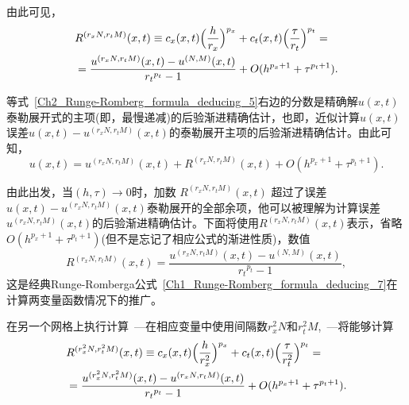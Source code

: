 \documentclass[twoside]{book}
\begin{document}
\begin{CJK*}{GBK}{song}
	由此可见，
	\begin{align}
	\label{Ch2_Runge-Romberg_formula_deducing_5}
	&R^{(r_x N, r_t M)}(x,t) \equiv c_x(x,t) \Big(\frac{h}{r_x}\Big)^{p_x} +  c_t(x,t) \Big(\frac{\tau}{r_t}\Big)^{p_t} = \notag\\
	&= \frac{u^{(r_x N,r_t M)}(x,t) - u^{(N,M)}(x,t)}{{r_t}^{p_t} - 1} + O(h^{p_x + 1} + \tau^{p_t + 1}).
	\end{align}
	
	等式~\eqref{Ch2_Runge-Romberg_formula_deducing_5}右边的分数是精确解$u(x,t)$泰勒展开式的主项(即，最慢递减)的后验渐进精确估计，也即，近似计算$u(x,t)$误差$u(x,t) - u^{(r_x N, r_t M)}(x,t)$的泰勒展开主项的后验渐进精确估计。由此可知，
	\begin{equation*}
	\label{Ch2_Runge-Romberg_formula_deducing_6}
	u(x,t) = u^{(r_x N, r_t M)}(x,t) + R^{(r_x N, r_t M)}(x,t) + O(h^{p_x + 1} + \tau^{p_t + 1}).
	\end{equation*}
	
	由此出发，当$(h,\tau) \to 0$时，加数 $R^{(r_x N, r_t M)}(x,t)$ 超过了误差$u(x,t) - u^{(r_x N, r_t M)}(x,t)$泰勒展开的全部余项，他可以被理解为计算误差$u^{(r_x N, r_t M)}(x,t)$的后验渐进精确估计。下面将使用$R^{(r_x N, r_t M)}(x,t)$表示，省略$O(h^{p_x + 1} + \tau^{p_t + 1})$(但不是忘记了相应公式的渐进性质)，数值
	\begin{equation}
	\label{Ch2_Runge-Romberg_formula_deducing_7}
	R^{(r_x N, r_t M)}(x,t)  = \frac{u^{(r_x N, r_t M)}(x,t) - u^{(N,M)}(x,t)}{{r_t}^{p_t} - 1},
	\end{equation}
	这是经典Runge-Romberga公式~\eqref{Ch1_Runge-Romberg_formula_deducing_7}在计算两变量函数情况下的推广。
	
	在另一个网格上执行计算~---在相应变量中使用间隔数$r_x^2 N$和$r_t^2 M$,~---将能够计算
	\begin{align*}
	\label{Ch2_Runge-Romberg_formula_deducing_8}
	&R^{(r_x^2 N, r_t^2 M)}(x,t) \equiv c_x(x,t) \Big(\frac{h}{r_x^2}\Big)^{p_x} +  c_t(x,t) \Big(\frac{\tau}{r_t^2}\Big)^{p_t} = \\
	&\vspace{+2.1cm}=\frac{u^{(r_x^2 N, r_t^2 M)}(x,t) - u^{({r_x} N, {r_t} M)}(x,t)}{{r_t}^{p_t} - 1} + O(h^{p_x + 1} + \tau^{p_t + 1}).
	\end{align*}
	

\end{CJK*}
\end{document}
